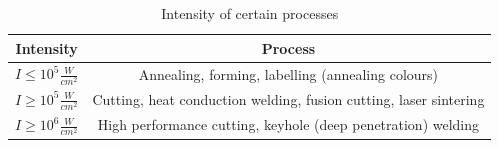 \begin{table}[h!]
    \begin{tabular}{|c|c|}
        \hline
        Intensity & Process \\
        \hline
        $I \le 10^5 \frac{W}{cm^2} $ & Annealing, forming, labelling (annealing colours) \\

        $I \ge 10^5 \frac{W}{cm^2}$ &  Cutting, heat conduction welding, fusion cutting, laser sintering\\
        
        $I \ge 10^6 \frac{W}{cm^2}$ & High performance cutting, keyhole (deep penetration) welding\\
        \hline
    \end{tabular}
    \caption{Intensity of certain processes}
    \label{tab:hef}
\end{table}
